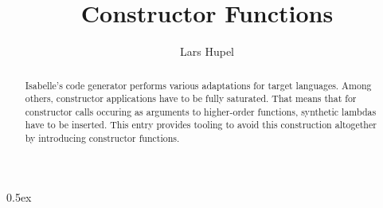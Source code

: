 \documentclass[11pt,a4paper]{article}
\begin{document}
\title{Constructor Functions}
\author{Lars Hupel}
\maketitle

\begin{abstract}
  Isabelle's code generator performs various adaptations for target languages. Among others,
  constructor applications have to be fully saturated. That means that for constructor calls
  occuring as arguments to higher-order functions, synthetic lambdas have to be inserted. This entry
  provides tooling to avoid this construction altogether by introducing constructor functions.
\end{abstract}

\parindent 0pt\parskip 0.5ex


\end{document}
